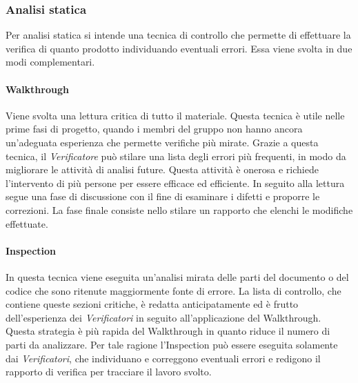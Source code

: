 \subsubsection{Analisi statica}
\label{cap:sezione 2.8.1 Analisi statica}
Per analisi statica si intende una tecnica di controllo che permette di effettuare la verifica di quanto prodotto individuando eventuali errori. Essa viene svolta in due modi complementari.

\paragraph{Walkthrough}
\label{cap:sezione 2.8.2 Walkthrough}
Viene svolta una lettura critica di tutto il materiale. Questa tecnica è utile 
nelle prime fasi di progetto, quando i membri del gruppo non hanno ancora un'adeguata esperienza che permette verifiche più mirate.
Grazie a questa tecnica, il \textit{Verificatore} può stilare una lista degli errori più frequenti, in modo da migliorare le attività di analisi future.
Questa attività è onerosa e richiede l'intervento di più persone per essere efficace ed efficiente. In seguito alla lettura segue una fase di discussione con il fine di esaminare i difetti e proporre le correzioni. La fase finale consiste nello stilare un rapporto che elenchi le modifiche effettuate.

\paragraph{Inspection}
In questa tecnica viene eseguita un'analisi mirata delle parti del documento o 
del codice che sono ritenute maggiormente fonte di errore. La lista di 
controllo, che contiene queste sezioni critiche, è redatta anticipatamente ed 
è frutto dell'esperienza dei \textit{Verificatori} in seguito all'applicazione del Walkthrough.
Questa strategia è più rapida del Walkthrough in quanto riduce il numero di 
parti da analizzare. Per tale ragione l'Inspection può essere eseguita 
solamente dai \textit{Verificatori}, che individuano e correggono eventuali errori e 
redigono il rapporto di verifica per tracciare il lavoro svolto.

